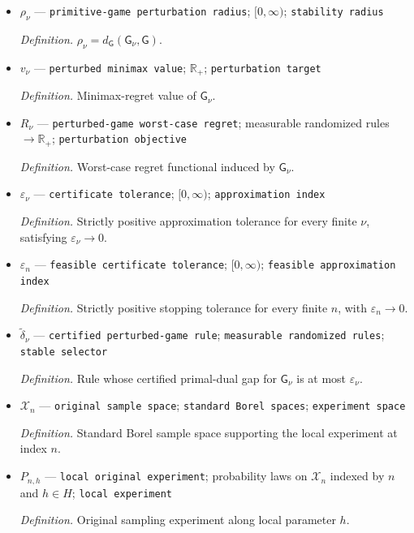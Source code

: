 \documentclass{article}
\begin{document}
\begin{itemize}
  \item \(\rho_{\nu}\) --- \texttt{primitive-\allowbreak{}game perturbation radius}; \([0,\infty)\); \texttt{stability radius}
  \par\smallskip\noindent\emph{Definition.} \(\rho_{\nu}=d_{\mathsf G}(\mathsf G_{\nu},\mathsf G)\).
  \item \(v_{\nu}\) --- \texttt{perturbed minimax value}; \(\mathbb R_{+}\); \texttt{perturbation target}
  \par\smallskip\noindent\emph{Definition.} Minimax-regret value of \(\mathsf G_{\nu}\).
  \item \(R_{\nu}\) --- \texttt{perturbed-\allowbreak{}game worst-\allowbreak{}case regret}; measurable randomized rules \(\to\mathbb R_{+}\); \texttt{perturbation objective}
  \par\smallskip\noindent\emph{Definition.} Worst-case regret functional induced by \(\mathsf G_{\nu}\).
  \item \(\varepsilon_{\nu}\) --- \texttt{certificate tolerance}; \([0,\infty)\); \texttt{approximation index}
  \par\smallskip\noindent\emph{Definition.} Strictly positive approximation tolerance for every finite \(\nu\), satisfying \(\varepsilon_{\nu}\to0\).
  \item \(\varepsilon_n\) --- \texttt{feasible certificate tolerance}; \([0,\infty)\); \texttt{feasible approximation index}
  \par\smallskip\noindent\emph{Definition.} Strictly positive stopping tolerance for every finite \(n\), with \(\varepsilon_n\to0\).
  \item \(\widetilde\delta_{\nu}\) --- \texttt{certified perturbed-\allowbreak{}game rule}; \texttt{measurable randomized rules}; \texttt{stable selector}
  \par\smallskip\noindent\emph{Definition.} Rule whose certified primal-dual gap for \(\mathsf G_{\nu}\) is at most \(\varepsilon_{\nu}\).
  \item \(\mathcal X_n\) --- \texttt{original sample space}; \texttt{standard Borel spaces}; \texttt{experiment space}
  \par\smallskip\noindent\emph{Definition.} Standard Borel sample space supporting the local experiment at index \(n\).
  \item \(P_{n,h}\) --- \texttt{local original experiment}; probability laws on \(\mathcal X_n\) indexed by \(n\) and \(h\in H\); \texttt{local experiment}
  \par\smallskip\noindent\emph{Definition.} Original sampling experiment along local parameter \(h\).

\end{itemize}
\end{document}
